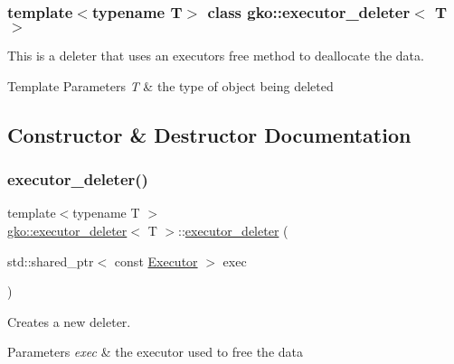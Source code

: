 \subsubsection*{template$<$typename T$>$\newline
class gko\+::executor\+\_\+deleter$<$ T $>$}

This is a deleter that uses an executor\textquotesingle{}s {\ttfamily free} method to deallocate the data. 


\begin{DoxyTemplParams}{Template Parameters}
{\em T} & the type of object being deleted \\
\hline
\end{DoxyTemplParams}


\subsection{Constructor \& Destructor Documentation}
\mbox{\label{classgko_1_1executor__deleter_a260f79ed87560fefc48d52b072bbb776}} 
\subsubsection{\texorpdfstring{executor\+\_\+deleter()}{executor\_deleter()}}
{\footnotesize\ttfamily template$<$typename T $>$ \\
\hyperlink{classgko_1_1executor__deleter}{gko\+::executor\+\_\+deleter}$<$ T $>$\+::\hyperlink{classgko_1_1executor__deleter}{executor\+\_\+deleter} (\begin{DoxyParamCaption}\item[{std\+::shared\+\_\+ptr$<$ const \hyperlink{classgko_1_1Executor}{Executor} $>$}]{exec }\end{DoxyParamCaption})\hspace{0.3cm}{\ttfamily [explicit]}}



Creates a new deleter. 


\begin{DoxyParams}{Parameters}
{\em exec} & the executor used to free the data \\
\hline
\end{DoxyParams}


